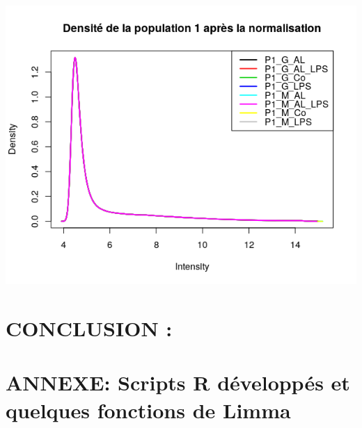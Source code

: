 \documentclass[a4paper,10pt]{article}
\begin{document}
\begin{center}
 \includegraphics[scale=0.5]{../../R/output/Densitypop1C.png}
\end{center}

\section{CONCLUSION :}
\section{ANNEXE: Scripts R développés et quelques fonctions de Limma}
\end{document}

